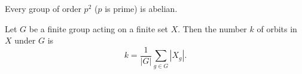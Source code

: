 \begin{coro}
    Every group of order $p^2$ ($p$ is prime) is abelian.
\end{coro}
\begin{teo}
    Let $G$ be a finite group acting on a finite set $X$. Then the number $k$ of orbits in $X$ under $G$ is
    \begin{equation*}
        k=\frac{1}{|G|}\sum_{g\in G}|X_g|.
    \end{equation*}
\end{teo}